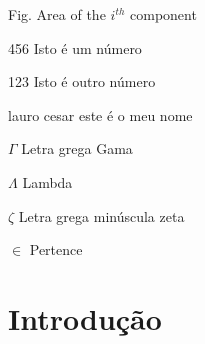 \documentclass[
	12pt,				%
	openright,			%
	twoside,			%
	a4paper,			%
	english,			%
	french,				%
	spanish,			%
	brazil,				%
	]{abntex2}
\begin{document}
\frenchspacing 


\imprimircapa

\imprimirfolhaderosto


\listoffigures*
\cleardoublepage


\listoftables*
\cleardoublepage


\begin{siglas}
  \item[Fig.] Area of the $i^{th}$ component
  \item[456] Isto é um número
  \item[123] Isto é outro número
  \item[lauro cesar] este é o meu nome
\end{siglas}

\begin{simbolos}
  \item[$ \Gamma $] Letra grega Gama
  \item[$ \Lambda $] Lambda
  \item[$ \zeta $] Letra grega minúscula zeta
  \item[$ \in $] Pertence
\end{simbolos}

\tableofcontents
\cleardoublepage


\textual

\chapter{Introdução}
\end{document}
